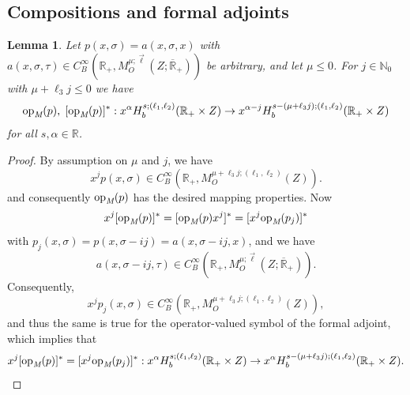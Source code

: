 \documentclass[reqno]{amsart}
\numberwithin{equation}{section}
\newtheorem{lemma}[equation]{Lemma}
\theoremstyle{definition}
\def\N{\mathbb N}
\def\R{\mathbb R}
\def\opm{\textup{op}_{\textit{M}}}
\begin{document}
\subsection{Compositions and formal adjoints}

\begin{lemma}\label{ImprovedMappingProps}
Let $p(x,\sigma) = a(x,\sigma,x)$ with $a(x,\sigma,\tau) \in C^{\infty}_B(\R_+,M^{\mu;\vec{\ell}}_O(Z;\overline{\R}_+))$ be arbitrary, and let $\mu \leq 0$. For $j \in \N_0$ with $\mu+\ell_3j \leq 0$ we have
$$
\opm(p),\; [\opm(p)]^* : x^{\alpha}H^{s;(\ell_1,\ell_2)}_b(\R_+\times Z) \to x^{\alpha-j}H^{s-(\mu+\ell_3 j);(\ell_1,\ell_2)}_b(\R_+\times Z)
$$
for all $s,\alpha \in \R$.
\end{lemma}
\begin{proof}
By assumption on $\mu$ and $j$, we have
$$
x^jp(x,\sigma) \in C^{\infty}_B(\R_+,M_O^{\mu+\ell_3 j;(\ell_1,\ell_2)}(Z)).
$$
and consequently $\opm(p)$ has the desired mapping properties. Now
$$
x^j[\opm(p)]^* = [\opm(p)x^j]^* = [x^j\opm(p_{j})]^*
$$
with $p_j(x,\sigma) = p(x,\sigma-ij) = a(x,\sigma-ij,x)$, and we have
$$
a(x,\sigma-ij,\tau) \in C^{\infty}_B(\R_+,M^{\mu;\vec{\ell}}_O(Z;\overline{\R}_+)).
$$
Consequently,
$$
x^jp_j(x,\sigma) \in C^{\infty}_B(\R_+,M_O^{\mu+\ell_3 j;(\ell_1,\ell_2)}(Z)),
$$
and thus the same is true for the operator-valued symbol of the formal adjoint, which implies that
$$
x^j[\opm(p)]^*= [x^j\opm(p_j)]^* : x^{\alpha}H^{s;(\ell_1,\ell_2)}_b(\R_+\times Z) \to x^{\alpha}H^{s-(\mu+\ell_3 j);(\ell_1,\ell_2)}_b(\R_+\times Z).
$$
\end{proof}
\end{document}
